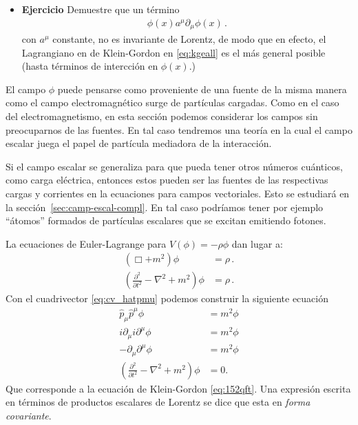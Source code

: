 \begin{itemize}
\item \textbf{Ejercicio}
Demuestre que un término
\begin{align}
  \phi(x)a^\mu\partial_\mu\phi(x)\,.
\end{align}
con $a^\mu$ constante, no es invariante de Lorentz, de modo que en efecto, el Lagrangiano en de Klein-Gordon en \eqref{eq:kgeall} es el más general posible (hasta términos de intercción en $\phi(x)$.)
\end{itemize}



El campo $\phi$ puede pensarse como proveniente de una fuente de la misma manera como el campo electromagnético surge de partículas cargadas. Como en el caso del electromagnetismo, en esta sección podemos considerar los campos sin preocuparnos de las fuentes. 
En tal caso tendremos una teoría en la cual el campo escalar juega el papel de partícula mediadora de la interacción.

Si el campo escalar se generaliza para que pueda tener otros números
cuánticos, como carga eléctrica, entonces estos pueden ser las fuentes
de las respectivas cargas y corrientes en la ecuaciones para campos
vectoriales. Esto se estudiará en la
sección~\ref{sec:camp-escal-compl}. En tal caso podríamos tener por
ejemplo ``átomos'' formados de partículas escalares que se excitan
emitiendo fotones.


La ecuaciones de Euler-Lagrange para $V(\phi)=-\rho\phi$ dan lugar a:
\begin{align}
  \label{eq:30qft}
  (\Box+m^2)\phi&=\rho\,.\nonumber\\
  \left(\frac{\partial^2}{\partial t^2}-\nabla^2+m^2\right)\phi&=\rho\,.
\end{align}
Con el cuadrivector \eqref{eq:cv_hatpmu} podemos construir la
siguiente ecuación
\begin{align}
  \hat{p}_\mu\hat{p}^\mu\phi&=m^2\phi\nonumber\\
  i\partial_\mu i\partial^\mu\phi&=m^2\phi\nonumber\\
  -\partial_\mu\partial^\mu\phi&=m^2\phi\nonumber\\
  \label{eq:waveec}
  \left(\frac{\partial^2}{\partial t^2}-\nabla^2+m^2\right)\phi&=0.
\end{align}
Que corresponde a la ecuación de Klein-Gordon \eqref{eq:152qft}. Una expresión escrita en términos de productos escalares de Lorentz se dice que esta en \emph{forma covariante}. 

